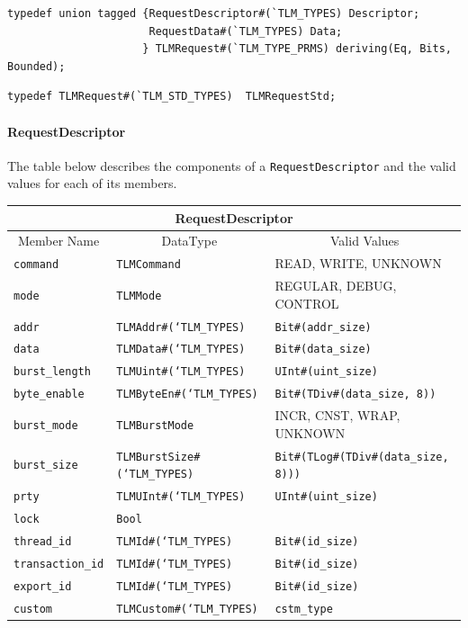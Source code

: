 \documentclass[twoside,letterpaper]{article}
\newcommand{\te}[1]{\texttt{#1}}
\begin{document}
\begin{verbatim}
typedef union tagged {RequestDescriptor#(`TLM_TYPES) Descriptor;
                      RequestData#(`TLM_TYPES) Data;       
                     } TLMRequest#(`TLM_TYPE_PRMS) deriving(Eq, Bits, Bounded);
\end{verbatim} 

\begin{verbatim}
typedef TLMRequest#(`TLM_STD_TYPES)  TLMRequestStd;
\end{verbatim}

\paragraph{RequestDescriptor}
The table below describes the components of a
\te{RequestDescriptor}  and  the valid values for each of its members.


\begin{center}
\begin{tabular}{|p{1.2 in}|p{2in}|p{3in}|}
\hline
\multicolumn{3}{|c|}{RequestDescriptor} \\
\hline
\multicolumn{1}{|c|}{Member Name}&\multicolumn{1}{|c|}{DataType}&\multicolumn{1}{|c|}{Valid Values} \\
\hline
\hline
\te{command}&\te{TLMCommand}&READ, WRITE, UNKNOWN\\
\hline
\te{mode}&\te{TLMMode}&REGULAR, DEBUG, CONTROL\\
\hline
\te{addr}&\te{TLMAddr\#(`TLM\_TYPES)}&\te{Bit\#(addr\_size)}\\
\hline
\te{data}&\te{TLMData\#(`TLM\_TYPES)}&\te{Bit\#(data\_size)}\\
\hline
\te{burst\_length}&\te{TLMUint\#(`TLM\_TYPES)}&\te{UInt\#(uint\_size)}\\
\hline
\te{byte\_enable}&\te{TLMByteEn\#(`TLM\_TYPES)}&\te{Bit\#(TDiv\#(data\_size,
8))}\\
\hline
\te{burst\_mode}&\te{TLMBurstMode}&INCR, CNST, WRAP, UNKNOWN\\
\hline
\te{burst\_size}&\te{TLMBurstSize\#(`TLM\_TYPES)}&\te{Bit\#(TLog\#(TDiv\#(data\_size,
8)))}\\
\hline
\te{prty}&\te{TLMUInt\#(`TLM\_TYPES)}&\te{UInt\#(uint\_size)}\\
\hline
\te{lock}&\te{Bool}&\\
\hline
\te{thread\_id}&\te{TLMId\#(`TLM\_TYPES)}&\te{Bit\#(id\_size)}\\
\hline
\te{transaction\_id}&\te{TLMId\#(`TLM\_TYPES)}&\te{Bit\#(id\_size)}\\
\hline
\te{export\_id}&\te{TLMId\#(`TLM\_TYPES)}&\te{Bit\#(id\_size)}\\
\hline
\te{custom}&\te{TLMCustom\#(`TLM\_TYPES)}&\te{cstm\_type}\\
\hline
\end{tabular}
\end{center}
\end{document}
